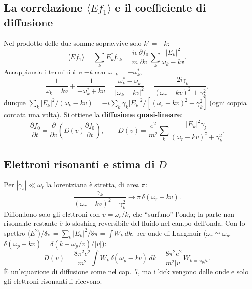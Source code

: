 \subsection{La correlazione $\langle Ef_1\rangle$ e il coefficiente di diffusione}
Nel prodotto delle due somme sopravvive solo $k'=-k$:
\begin{equation}
\langle Ef_1\rangle=\sum_kE_k^*f_{1k}=\frac{ie}{m}\frac{\partial f_0}{\partial v}\sum_k\frac{|E_k|^2}{\omega_k-kv}.
\end{equation}
Accoppiando i termini $k$ e $-k$ con $\omega_{-k}=-\omega_k^*$,
\begin{equation}
\frac{1}{\omega_k-kv}+\frac{1}{-\omega_k^*+kv}=\frac{\omega_k^*-\omega_k}{|\omega_k-kv|^2}=\frac{-2i\gamma_k}{(\omega_r-kv)^2+\gamma_k^2},
\end{equation}
dunque $\sum_k|E_k|^2/(\omega_k-kv)=-i\sum_k\gamma_k|E_k|^2/[(\omega_r-kv)^2+\gamma_k^2]$ (ogni coppia contata una volta). Si ottiene la \textbf{diffusione quasi-lineare}:
\begin{equation}
\frac{\partial f_0}{\partial t}=\frac{\partial}{\partial v}\left(D(v)\frac{\partial f_0}{\partial v}\right),\qquad D(v)=\frac{e^2}{m^2}\sum_k\frac{|E_k|^2\gamma_k}{(\omega_r-kv)^2+\gamma_k^2}.
\end{equation}

\subsection{Elettroni risonanti e stima di $D$}
Per $|\gamma_k|\ll\omega_r$ la lorentziana è stretta, di area $\pi$:
\begin{equation}
\frac{\gamma_k}{(\omega_r-kv)^2+\gamma_k^2}\to\pi\,\delta(\omega_r-kv).
\end{equation}
Diffondono solo gli elettroni con $v=\omega_r/k$, che ``surfano'' l'onda; la parte non risonante restante è lo sloshing reversibile del fluido nel campo dell'onda. Con lo spettro $\langle E^2\rangle/8\pi=\sum_k|E_k|^2/8\pi=\int W_k\,dk$, per onde di Langmuir ($\omega_r\simeq\omega_p$, $\delta(\omega_p-kv)=\delta(k-\omega_p/v)/|v|$):
\begin{equation}
D(v)=\frac{8\pi^2e^2}{m^2}\int W_k\,\delta(\omega_p-kv)\,dk=\frac{8\pi^2e^2}{m^2|v|}\,W_{k=\omega_p/v}.
\end{equation}
È un'equazione di diffusione come nel cap.~7, ma i kick vengono dalle onde e solo gli elettroni risonanti li ricevono.

